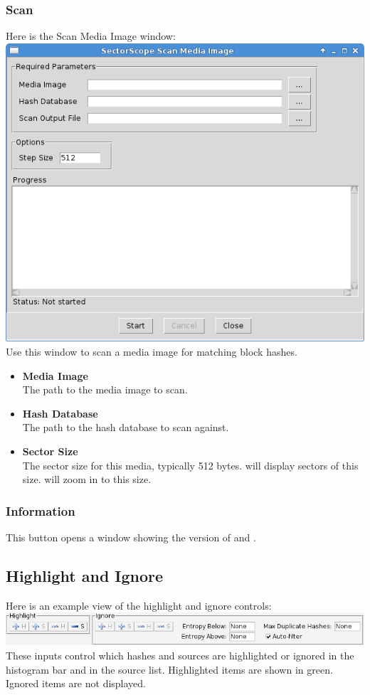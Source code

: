 \documentclass[11pt,fleqn]{article} %
\begin{document}
\subsubsection{Scan}
Here is the \sscope Scan Media Image window:\\
\includegraphics[scale=.4]{screenshots/scan}\\
Use this window to scan a media image for matching block hashes.
\begin{itemize}
\item \textbf{Media Image}\\
The path to the media image to scan.
\item \textbf{Hash Database}\\
The path to the hash database to scan against.
\item \textbf{Sector Size}\\
The sector size for this media, typically 512 bytes. \sscope will display sectors of this size. \sscope will zoom in to this size.
\end{itemize}

\subsubsection{Information}
This button opens a window showing the version of \sscope and \hdb.

\subsection{Highlight and Ignore}
Here is an example view of the highlight and ignore controls:\\
\includegraphics[scale=.4]{screenshots/highlight_and_ignore}\\
These inputs control which hashes and sources are highlighted or ignored in the histogram bar and in the source list. Highlighted items are shown in green. Ignored items are not displayed.
\end{document}
